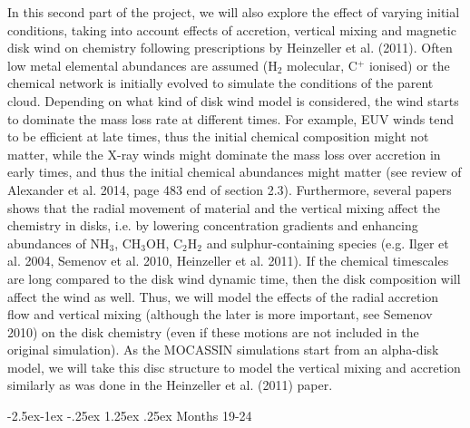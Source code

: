 \documentclass[10pt,fleqn,twoside]{article}
\makeatletter
\renewcommand\paragraph{\@startsection{paragraph}{4}{\z@}%
            {-2.5ex\@plus -1ex \@minus -.25ex}%
            {1.25ex \@plus .25ex}%
            {\normalfont\normalsize\bfseries}}
\makeatother
\begin{document}
In this second part of the project, we will also explore the effect of varying initial conditions, taking into account effects of accretion, vertical mixing and magnetic disk wind on chemistry following prescriptions by Heinzeller et al. (2011). Often low metal elemental abundances are assumed (H$_2$ molecular, C$^+$ ionised) or the chemical network is initially evolved to simulate the conditions of the parent cloud.  Depending on what kind of disk wind model is considered, the wind starts to dominate the mass loss rate at different times. For example, EUV winds tend to be efficient at late times, thus the initial chemical composition might not matter, while the X-ray winds might dominate the mass loss over accretion in early times, and thus the initial chemical abundances might matter (see review of Alexander et al. 2014, page 483 end of section 2.3). Furthermore, several papers shows that the radial movement of material and the vertical mixing affect the chemistry in disks, i.e. by lowering concentration gradients and enhancing abundances of NH$_3$, CH$_3$OH, C$_2$H$_2$ and sulphur-containing species (e.g. Ilger et al. 2004, Semenov et al. 2010, Heinzeller et al. 2011). If the chemical timescales are long compared to the disk wind dynamic time, then the disk composition will affect the wind as well. Thus, we will model the effects of the radial accretion flow and vertical mixing (although the later is more important, see Semenov 2010) on the disk chemistry (even if these motions are not included in the original simulation). As the MOCASSIN simulations start from an alpha-disk model, we will take this disc structure to model the vertical mixing and accretion similarly as was done in the Heinzeller et al. (2011) paper.

\paragraph{Months 19-24}
\end{document}
